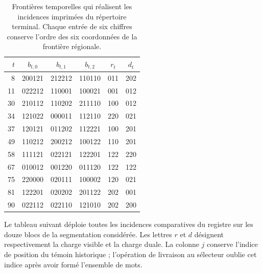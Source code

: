 \begin{table}[htbp]
\centering\small
\begin{tabular}{rccc cc}
\toprule
$t$&$b_{t,0}$&$b_{t,1}$&$b_{t,2}$&$r_t$&$d_t$\\
\midrule
8 &200121&212212&110110&011&202\\
11&022212&110001&100021&001&012\\
30&210112&110202&211110&100&012\\
34&121022&000011&112110&220&021\\
37&120121&011202&112221&100&201\\
49&110212&200212&100122&110&201\\
58&111121&022121&122201&122&220\\
67&010012&001220&011120&122&122\\
75&220000&020111&100002&120&021\\
81&122201&020202&201122&202&001\\
90&022112&022110&121010&202&200\\
\bottomrule
\end{tabular}
\caption{Frontières temporelles qui réalisent les incidences imprimées du
répertoire terminal. Chaque entrée de six chiffres conserve l'ordre des
six coordonnées de la frontière régionale.}
\label{act21:tab:terminal-bandas-testigo}
\end{table}

Le tableau suivant déploie toutes les incidences comparatives du
registre sur les douze blocs de la segmentation considérée. Les
lettres $r$ et $d$ désignent respectivement la charge visible et la charge
duale. La colonne $j$ conserve l'indice de position du témoin historique ;
l'opération de livraison au sélecteur oublie cet indice après avoir formé
l'ensemble de mots.

